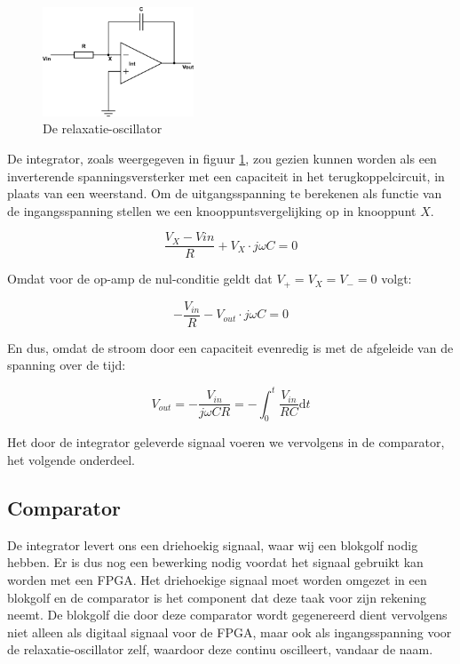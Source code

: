 \documentclass{report}
\begin{document}
\begin{figure}
	\centering
	\includegraphics[width=0.4\textwidth]{integrator.png}
	\caption{De relaxatie-oscillator}
	\label{fig:int}
\end{figure}

De integrator, zoals weergegeven in figuur \ref{fig:int}, zou gezien kunnen worden als een inverterende spanningsversterker met een capaciteit in het terugkoppelcircuit, in plaats van een weerstand. Om de uitgangsspanning te berekenen als functie van de ingangsspanning stellen we een knooppuntsvergelijking op in knooppunt $X$.

$$\frac{V_{X} - V{in}}{R} + V_{X} \cdot j\omega C = 0$$

\noindent
Omdat voor de op-amp de nul-conditie geldt dat $V_{+} = V_{X} = V_{-} = 0$ volgt:

$$-\frac{V_{in}}{R} - V_{out} \cdot j\omega C = 0$$

\noindent
En dus, omdat de stroom door een capaciteit evenredig is met de afgeleide van de spanning over de tijd:

\begin{equation}
	V_{out} = -\frac{V_{in}}{j\omega CR} = -\int_0^t \frac{V_{in}}{RC} \mathrm{d}t
	\label{eq:int}
\end{equation}

\noindent
Het door de integrator geleverde signaal voeren we vervolgens in de comparator, het volgende onderdeel.

\subsection{Comparator}

De integrator levert ons een driehoekig signaal, waar wij een blokgolf nodig hebben. Er is dus nog een bewerking nodig voordat het signaal gebruikt kan worden met een FPGA. Het driehoekige signaal moet worden omgezet in een blokgolf en de comparator is het component dat deze taak voor zijn rekening neemt. De blokgolf die door deze comparator wordt gegenereerd dient vervolgens niet alleen als digitaal signaal voor de FPGA, maar ook als ingangsspanning voor de relaxatie-oscillator zelf, waardoor deze continu oscilleert, vandaar de naam.
\end{document}
